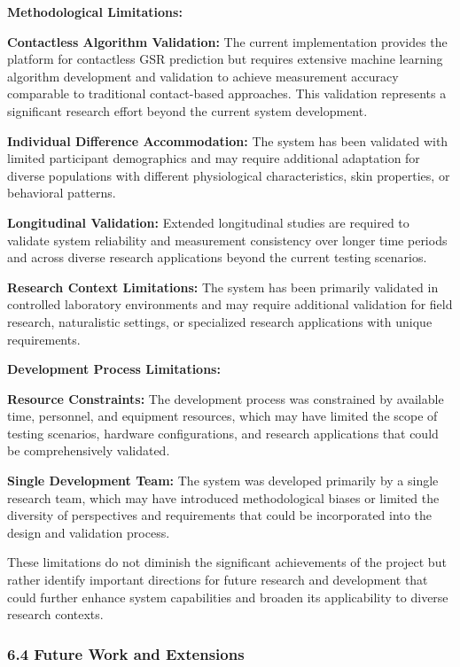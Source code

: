 \documentclass[12pt,a4paper]{report}
\begin{document}
\textbf{Methodological Limitations:}

\textbf{Contactless Algorithm Validation:}
The current implementation provides the platform for contactless GSR prediction but requires extensive machine learning
algorithm development and validation to achieve measurement accuracy comparable to traditional contact-based approaches.
This validation represents a significant research effort beyond the current system development.

\textbf{Individual Difference Accommodation:}
The system has been validated with limited participant demographics and may require additional adaptation for diverse
populations with different physiological characteristics, skin properties, or behavioral patterns.

\textbf{Longitudinal Validation:}
Extended longitudinal studies are required to validate system reliability and measurement consistency over longer time
periods and across diverse research applications beyond the current testing scenarios.

\textbf{Research Context Limitations:}
The system has been primarily validated in controlled laboratory environments and may require additional validation for
field research, naturalistic settings, or specialized research applications with unique requirements.

\textbf{Development Process Limitations:}

\textbf{Resource Constraints:}
The development process was constrained by available time, personnel, and equipment resources, which may have limited
the scope of testing scenarios, hardware configurations, and research applications that could be comprehensively
validated.

\textbf{Single Development Team:}
The system was developed primarily by a single research team, which may have introduced methodological biases or limited
the diversity of perspectives and requirements that could be incorporated into the design and validation process.

These limitations do not diminish the significant achievements of the project but rather identify important directions
for future research and development that could further enhance system capabilities and broaden its applicability to
diverse research contexts.

\subsubsection{6.4 Future Work and Extensions}
\end{document}
